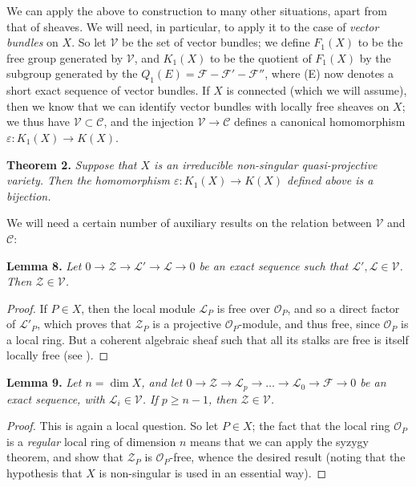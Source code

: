 \documentclass{article}
\newenvironment{itenv}[1]
  {\phantomsection\par\medskip\noindent\textbf{#1.}\itshape}
  {\par\medskip}
\newcommand{\scr}[1]{{\mathscr{#1}}}
\renewcommand{\cal}[1]{{\mathcal{#1}}}
\renewcommand{\geq}{\geqslant}
\newcommand{\oldpage}[1]{\marginpar{\footnotesize$\Big\vert$ \textit{p.~#1}}}
\begin{document}
We can apply the above to construction to many other situations, apart from that of sheaves.
We will need, in particular, to apply it to the case of \emph{vector bundles} on $X$.
So let $\cal{V}$ be the set of vector bundles;
we define $F_1(X)$ to be the free group generated by $\cal{V}$, and $K_1(X)$ to be the quotient of $F_1(X)$ by the subgroup generated by the $Q_1(E)=\scr{F}-\scr{F}'-\scr{F}''$, where (E) now denotes a short exact sequence of vector bundles.
If $X$ is connected (which we will assume), then we know that we can identify vector bundles with locally free sheaves on $X$;
we thus have $\cal{V}\subset\cal{C}$, and the injection $\cal{V}\to\cal{C}$ defines a canonical homomorphism $\varepsilon\colon K_1(X)\to K(X)$.

\begin{itenv}{Theorem 2}
\label{theorem2}
  Suppose that $X$ is an irreducible non-singular quasi-projective variety.
  Then the homomorphism $\varepsilon\colon K_1(X)\to K(X)$ defined above is a bijection.
\end{itenv}

We will need a certain number of auxiliary results on the relation between $\cal{V}$ and $\cal{C}$:

\begin{itenv}{Lemma 8}
\label{lemma8}
  Let $0\to\scr{Z}\to\scr{L}'\to\scr{L}\to0$ be an exact sequence such that $\scr{L}',\scr{L}\in\cal{V}$.
  Then $\scr{Z}\in\cal{V}$.
\end{itenv}

\begin{proof}
  \oldpage{106}
  If $P\in X$, then the local module $\scr{L}_P$ is free over $\scr{O}_P$, and so a direct factor of $\scr{L}'_P$, which proves that $\scr{Z}_P$ is a projective $\scr{O}_P$-module, and thus free, since $\scr{O}_P$ is a local ring.
  But a coherent algebraic sheaf such that all its stalks are free is itself locally free (see \cite[p.~242, lines~10--11 from the bottom]{12}).
\end{proof}

\begin{itenv}{Lemma 9}
\label{lemma9}
  Let $n=\dim X$, and let $0\to\scr{Z}\to\scr{L}_p\to\ldots\to\scr{L}_0\to\scr{F}\to0$ be an exact sequence, with $\scr{L}_i\in\cal{V}$.
  If $p\geq n-1$, then $\scr{Z}\in\cal{V}$.
\end{itenv}

\begin{proof}
  This is again a local question.
  So let $P\in X$;
  the fact that the local ring $\scr{O}_P$ is a \emph{regular} local ring of dimension $n$ means that we can apply the syzygy theorem, and show that $\scr{Z}_P$ is $\scr{O}_P$-free, whence the desired result (noting that the hypothesis that $X$ is non-singular is used in an essential way).
\end{proof}
\end{document}

